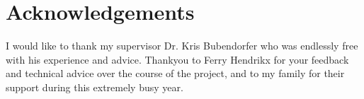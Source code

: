 \chapter*{Acknowledgements}

I would like to thank my supervisor Dr. Kris Bubendorfer who was endlessly free with his experience and advice. Thankyou to Ferry Hendrikx for your feedback and technical advice over the course of the project, and to my family for their support during this extremely busy year. 
